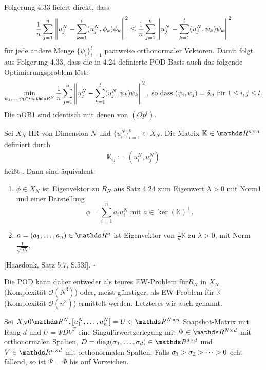 Folgerung 4.33 liefert direkt, dass
\[
\frac{1}{n} \sum_{j=1}^n \left\Vert u_j^N - \sum_{k=1}^{l} (u_j^N,\phi_k)\phi_k \right\Vert^2 \le \frac{1}{n} \sum_{j=1}^n \left\Vert u_j^N - \sum_{k=1}^{l} (u_j^N,\psi_k)\psi_k \right\Vert^2
\]
für jede andere Menge $\{\psi_i\}_{i=1}^l$ paarweise orthonormaler Vektoren.
Damit folgt aus Folgerung 4.33, dass die in 4.24 definierte POD-Basis auch das folgende Optimierungsproblem löst:
\[
\min\limits_{\psi_1\dt{,}\psi_l\in\R^N} \frac{1}{n} \sum_{j=1}^n \norm{u_j^N - \sum_{k=1}^{l} (u_j^N,\psi_k)\psi_k }^2, \text{ so dass } (\psi_i,\psi_j) = \delta_{ij} \text{ für } 1\le i,j \le l.
\]
Die nOB1 sind identisch mit denen von $(Op^l)$.

Sei $X_N$ HR von Dimension $N$ und $\{u_i^N\}_{i=1}^n\subset X_N$.
Die Matrix $\mathbb{K}\in \R^{n\times n}$ definiert durch
\begin{align}
\mathbb{K}_{ij} := (u_i^N,u_j^N)
\end{align}
heißt .
Dann sind äquivalent:
\begin{enumerate}[(1)]
	\item $\phi\in X_N$ ist Eigenvektor zu $R_N$ aus Satz 4.24 zum Eigenwert $\lambda>0$ mit Norm1 und einer Darstellung
	\[
	\phi = \sum_{i=1}^n a_i u_i^N \text{ mit } a\in \ker (\mathbb{K})^{\perp}.
	\]
	\item $a=(a_1\dt{,}a_n)\in \R^n$ ist Eigenvektor von $\frac{1}{n} \mathbb{K}$ zu $\lambda>0$, mit Norm $\frac{1}{\sqrt{n\lambda}}$.
\end{enumerate}

 [Haasdonk, Satz 5.7, S.53f].
\hfill $\square$

Die POD kann daher entweder als teures EW-Problem für$R_N$ in $X_N$ (Komplexität $\mathcal{O}(N^3)$) oder, meist günstiger, als EW-Problem für $\mathbb{K}$ (Komplexität $\mathcal{O}(n^3)$) ermittelt werden.
Letzteres wir auch  genannt.

Sei $X_N0\R^N, [u_1^N\dt{,}u_n^N] =U \in \R^{N\times n}$ Snapshot-Matrix mit Rang $d$ und $U=\Psi DV^T$ eine Singulärwertzerlegung mit $\Psi\in \R^{N\times d}$ mit orthonormalen Spalten, $D=\diag(\sigma_1\dt{,}\sigma_d)\in \R^{d\times d}$ und $V\in \R^{n\times d}$ mit orthonormalen Spalten.
Falls $\sigma_1>\sigma_2> \dots >0$ echt fallend, so ist $\Psi=\Phi$ bis auf Vorzeichen.\\

